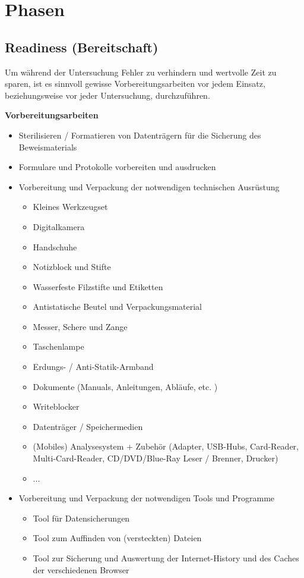 \section{Phasen}
\subsection{Readiness (Bereitschaft)}
Um während der Untersuchung Fehler zu verhindern und wertvolle Zeit zu sparen, ist es sinnvoll gewisse Vorbereitungsarbeiten vor jedem Einsatz, beziehungsweise vor jeder Untersuchung, durchzuführen.

\textbf{Vorbereitungsarbeiten}
\begin{itemize}
\item Sterilisieren / Formatieren von Datenträgern für die Sicherung des Beweismaterials
\item Formulare und Protokolle vorbereiten und ausdrucken
\item Vorbereitung und Verpackung der notwendigen technischen Ausrüstung
\begin{itemize}
\item Kleines Werkzeugset
\item Digitalkamera
\item Handschuhe
\item Notizblock und Stifte
\item Wasserfeste Filzstifte und Etiketten
\item Antistatische Beutel und Verpackungsmaterial
\item Messer, Schere und Zange
\item Taschenlampe
\item Erdungs- / Anti-Statik-Armband
\item Dokumente (Manuals, Anleitungen, Abläufe, etc. )
\item Writeblocker\footnotemark[1]
\item Datenträger / Speichermedien
\item (Mobiles) Analysesystem + Zubehör (Adapter, USB-Hubs, Card-Reader, Multi-Card-Reader, CD/DVD/Blue-Ray Leser / Brenner, Drucker)
\item ...
\end{itemize}
\item Vorbereitung und Verpackung der notwendigen Tools und Programme
\begin{itemize}
\item Tool für Datensicherungen
\item Tool zum Auffinden von (versteckten) Dateien
\item Tool zur Sicherung und Auswertung der Internet-History und des Caches der verschiedenen Browser

\end{itemize}
\end{itemize}
